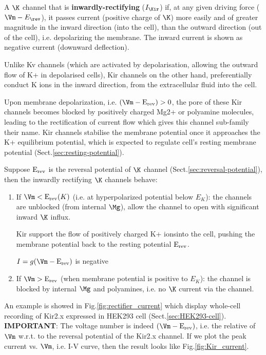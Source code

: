 A $\K$ channel that is {\bf inwardly-rectifying} ($I_\Kir$) if, at any given
driving force ($\Vm-E_\rev$), it passes current (positive charge of $\K$) more
easily and of greater magnitude in the inward direction (into the cell), than
the outward direction (out of the cell), i.e. depolarizing the membrane. The
inward current is shown as negative current (downward deflection).

\begin{mdframed}
Unlike Kv channels (which are activated by depolarisation, allowing the outward
flow of K+ in depolarised cells), Kir channels on the other hand, preferentially
conduct K ions in the inward direction, from the extracellular fluid into the
cell. 

Upon membrane depolarization, i.e. $(\Vm-\Erev)>0$, the pore of these Kir
channels becomes blocked by positively charged Mg2+ or polyamine molecules,
leading to the rectification of current flow which gives this channel sub-family
their name. Kir channels stabilise the membrane potential once it approaches the
K+ equilibrium potential, which is expected to regulate cell's resting membrane
potential (Sect.\ref{sec:resting-potential}).

\end{mdframed}

Suppose ${\text{E}_{\text{rev}}}$ is the reversal potential of $\K$ channel
(Sect.\ref{sec:reversal-potential}), then the inwardly rectifying $\K$ channels
behave:
\begin{enumerate}
  \item If $\Vm < \Erev(K)$ (i.e. at hyperpolarized potential below $E_K$): the
  channels are unblocked (from internal $\Mg$), allow the channel to open with
  significant inward $\K$ influx.
  
  Kir support the flow of positively charged K+ ionsinto the cell, pushing the
  membrane potential back to the resting potential ${\text{E}_{\text{rev}}}$.
  
  $I=g(\Vm-\Erev)$ is negative
  
  \item If $\Vm > \Erev$ (when membrane potential is positive to $E_K$): the
  channel is blocked by internal $\Mg$ and polyamines, i.e. no $\K$ current via
  the channel.
\end{enumerate}

An example is showed in Fig.\ref{fig:rectifier_current} which display whole-cell
recording of Kir2.x expressed in HEK293 cell (Sect.\ref{sec:HEK293-cell}). {\bf
IMPORTANT}: The voltage number is indeed $(\Vm - \Erev)$, i.e. the relative of
$\Vm$ w.r.t. to the reversal potential of the Kir2.x channel. If we plot the
peak current vs. $\Vm$, i.e. I-V curve, then the result looks like
Fig.\ref{fig:Kir_current}.

